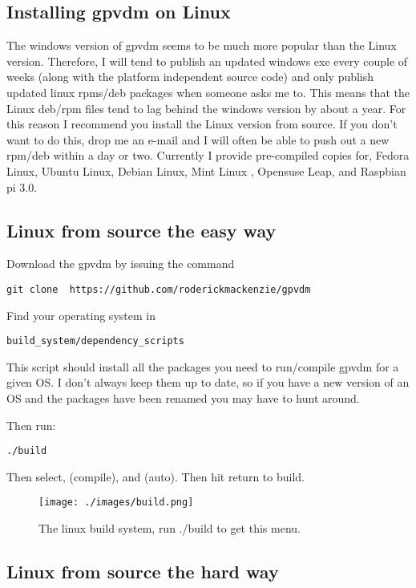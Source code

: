 \subsection{Installing gpvdm on Linux} \label{installing_on_linux}
The windows version of gpvdm seems to be much more popular than the Linux version.  Therefore, I will tend to publish an updated windows exe every couple of weeks (along with the platform independent source code) and only publish updated linux rpms/deb packages when someone asks me to.  This means that the Linux deb/rpm files tend to lag behind the windows version by about a year.  For this reason I recommend you install the Linux version from source.  If you don't want to do this, drop me an e-mail and I will often be able to push out a new rpm/deb within a day or two.  Currently I provide pre-compiled copies for, Fedora Linux, Ubuntu Linux, Debian Linux, Mint Linux , Opensuse Leap, and Raspbian pi 3.0.


\subsection{Linux from source the easy way}
Download the gpvdm by issuing the command

\begin{verbatim}
git clone  https://github.com/roderickmackenzie/gpvdm
\end{verbatim}
Find your operating system in

\begin{verbatim}
build_system/dependency_scripts
\end{verbatim}

This script should install all the packages you need to run/compile gpvdm for a given OS. I don't always keep them up to date, so if you have a new version of an OS and the packages have been renamed you may have to hunt around.

Then run:
\begin{verbatim}
./build
\end{verbatim}

Then select, (compile), and (auto). Then hit return to build.


\begin{figure}[ht!]
\centering
\texttt{[image: ./images/build.png]}
\caption{The linux build system, run ./build to get this menu.  }
\label{fig:build}
\end{figure}


\subsection{Linux from source the hard way}

